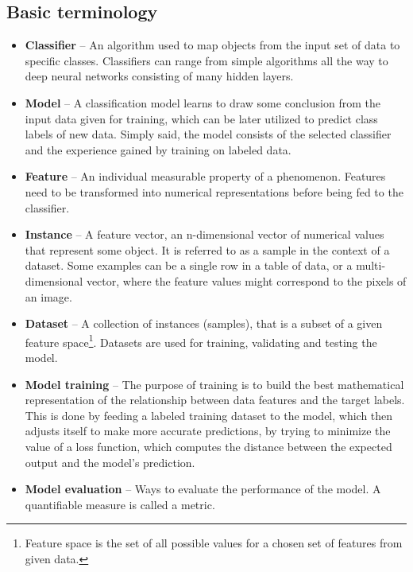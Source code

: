 \subsection*{Basic terminology}
\label{basic-terminology}
\begin{itemize}
    \item \textbf{Classifier} -- An algorithm used to map objects from the input set of data
    to specific classes. Classifiers can range from simple algorithms all the way
    to deep neural networks consisting of many hidden layers.
    \item \textbf{Model} -- A classification model learns to draw some conclusion
    from the input data given for training, which can be later utilized to predict
    class labels of new data. Simply said, the model consists of the selected classifier
    and the experience gained by training on labeled data.
    \item \textbf{Feature} -- An individual measurable property of a phenomenon. Features
    need to be transformed into numerical representations before being fed to the classifier.
    \item \textbf{Instance} -- A feature vector, an n-dimensional vector of numerical values
    that represent some object. It is referred to as a sample in the context of a dataset.
    Some examples can be a single row in a table of data,
    or a multi-dimensional vector, where the feature values might correspond to the pixels of an image.
    \item \textbf{Dataset} -- A collection of instances (samples), that is a subset of a given feature
    space\footnote{Feature space is the set of all possible values for a chosen set of features from given data.}.
    Datasets are used for training, validating and testing the model.
    \item \textbf{Model training} -- The purpose of training is to build the best mathematical representation
    of the relationship between data features and the target labels. This is done by feeding a labeled
    training dataset to the model, which then adjusts itself to make more accurate predictions,
    by trying to minimize the value of a loss function, which computes the distance
    between the expected output and the model's prediction.
    \item \textbf{Model evaluation} -- Ways to evaluate the performance of the model.
    A quantifiable measure is called a metric.
\end{itemize}


